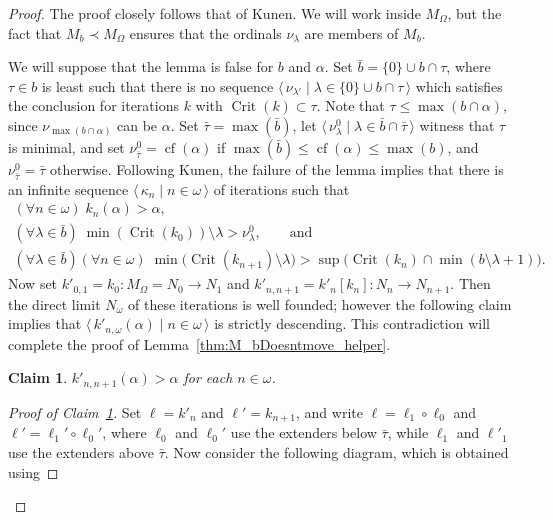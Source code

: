 \documentclass[
twoside,
]{article}
\newtheorem{claim}{Claim}[theorem]
\theoremstyle{definition}
\theoremstyle{remark}
\newcommand{\ords}{\Omega}
\newcommand{\sing}[1]{\{#1\}}
\newcommand{\pair}[1]{\langle#1\rangle}
\newcommand{\seq}[1]{\pair{\,#1\,}}
\DeclareMathOperator{\Crit}{Crit}
\DeclareMathOperator{\cof}{cf}
\begin{document}
\begin{proof}
  The proof closely follows that of Kunen.  We will work inside
  $M_{\ords}$, but the fact that  $M_b\prec M_\ords$ ensures that the ordinals
  $\nu_\lambda$ are members of $M_b$.

  We will suppose that the lemma is false for
  $b$ and $\alpha$.
  Set $\bar b=\sing{0}\cup b\cap\tau$, where $\tau\in b$ is
  least such that there is no sequence
  $\seq{\nu_{\lambda'}\mid\lambda\in \sing{0}\cup b\cap\tau}$ which satisfies the
  conclusion for iterations $k$ with $\Crit(k)\subset\tau$. Note
  that $\tau\leq\max(b\cap\alpha)$, since $\nu_{\max(b\cap\alpha)}$
  can be $\alpha$.  Set $\bar\tau=\max(\bar b)$, 
  let
  $\seq{\nu^{0}_{\lambda}\mid \lambda\in\bar b\cap\bar\tau}$ witness that
  $\tau$ is minimal, and set $\nu^0_{\bar\tau}=\cof(\alpha)$ if
  $\max(\bar b)\leq\cof(\alpha)\leq\max(b)$, and 
  $\nu^0_{\bar\tau}=\bar\tau$ otherwise.   Following Kunen, the
  failure of the lemma implies that there is  an infinite sequence
  $\seq{\kappa_n\mid n\in\omega}$ of iterations such that
  \begin{gather*}
    (\forall n\in\omega)\;k_n(\alpha)>\alpha,\\
    (\forall\lambda\in\bar
    b)\;\min(\Crit(k_0))\setminus\lambda>\nu^{0}_{\lambda},\qquad\text{and}\\
    (\forall\lambda\in\bar b)(\forall 
    n\in\omega)
    \;\min\bigl(\Crit(k_{n+1})\setminus\lambda\bigr)>\sup\bigl(\Crit(k_{n})\cap\min(b\setminus\lambda+1)\bigr).   
  \end{gather*}
  Now set $k'_{0,1}=k_0\colon M_{\ords}=N_0\to N_1$ and
  $k'_{n,n+1}=k'_{n}[k_{n}]\colon N_{n}\to N_{n+1}$.   Then the direct
  limit $N_{\omega}$ of these iterations is well founded; however the
  following claim implies that $\seq{k'_{n,\omega}(\alpha)\mid
    n\in\omega}$ is strictly descending.  This contradiction will
  complete the proof of Lemma~\ref{thm:M_bDoesntmove_helper}.
  \begin{claim}\label{thm:M_bDoesntmove_claim}
    $k'_{n,n+1}(\alpha)>\alpha$ for each $n\in\omega$.
  \end{claim}
  \begin{proof}[Proof of Claim~\ref{thm:M_bDoesntmove_claim}]
    Set $\ell=k'_{n}$ and $\ell'=k_{n+1}$, and write $\ell=\ell_{1}\circ
    \ell_{0}$ and $\ell'=\ell_{1}'\circ \ell_{0}'$, where $\ell_0$ and
    $\ell_0'$ use the extenders below $\bar\tau$, while $\ell_1$
    and $\ell'_1$ use the extenders above $\bar{\tau}$.   Now
    consider the following diagram,  which is obtained using

\end{proof}
\end{proof}
\end{document}
